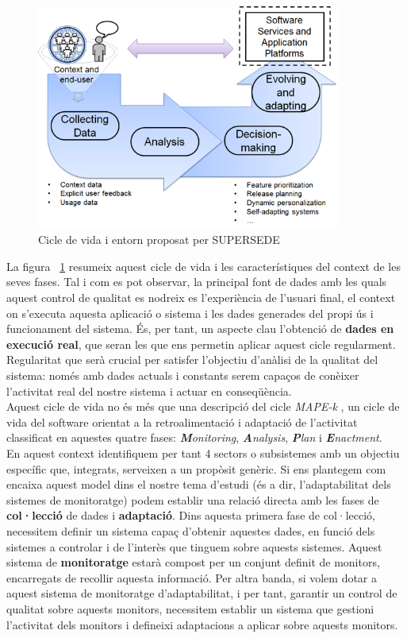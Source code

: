 \begin{figure}
\centering
\includegraphics[width=10cm]{Figures/Figure2}
\decoRule
\caption[Cicle de vida i entorn proposat per SUPERSEDE]{Cicle de vida i entorn proposat per SUPERSEDE}
\label{fig:Figura2}
\end{figure}

La figura ~\ref{fig:Figura2} resumeix aquest cicle de vida i les característiques del context de les seves fases. Tal i com es pot observar, la principal font de dades amb les quals aquest control de qualitat es nodreix es l'experiència de l'usuari final, el context on s'executa aquesta aplicació o sistema i les dades generades del propi ús i funcionament del sistema. És, per tant, un aspecte clau l'obtenció de \textbf{dades en execució real}, que seran les que ens permetin aplicar aquest cicle regularment. Regularitat que serà crucial per satisfer l'objectiu d'anàlisi de la qualitat del sistema: només amb dades actuals i constants serem capaços de conèixer l'activitat real del nostre sistema i actuar en conseqüència.\\

Aquest cicle de vida no és més que una descripció del cicle \textit{MAPE-k} \cite{mapek1}\cite{mapek2}, un cicle de vida del software orientat a la retroalimentació i adaptació de l'activitat classificat en aquestes quatre fases: \textit{\textbf{M}onitoring}, \textit{\textbf{A}nalysis}, \textit{\textbf{P}lan} i \textit{\textbf{E}nactment}.\\

En aquest context identifiquem per tant 4 sectors o subsistemes amb un objectiu específic que, integrats, serveixen a un propòsit genèric. Si ens plantegem com encaixa aquest model dins el nostre tema d'estudi (és a dir, l'adaptabilitat dels sistemes de monitoratge) podem establir una relació directa amb les fases de \textbf{col·lecció} de dades i \textbf{adaptació}. Dins aquesta primera fase de col·lecció, necessitem definir un sistema capaç d'obtenir aquestes dades, en funció dels sistemes a controlar i de l'interès que tinguem sobre aquests sistemes. Aquest sistema de \textbf{monitoratge} estarà compost per un conjunt definit de monitors, encarregats de recollir aquesta informació. Per altra banda, si volem dotar a aquest sistema de monitoratge d'adaptabilitat, i per tant, garantir un control de qualitat sobre aquests monitors, necessitem establir un sistema que gestioni l'activitat dels monitors i defineixi adaptacions a aplicar sobre aquests monitors.\\

